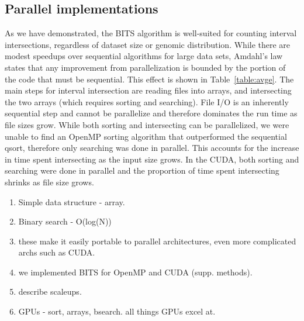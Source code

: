 \documentclass{bioinfo}
\begin{document}
	\subsection{Parallel implementations}
	
	As we have demonstrated, the BITS algorithm is well-suited for counting interval
	intersections, regardless of dataset size or genomic distribution.  While there
	are modest speedups over sequential algorithms for large data sets, Amdahl's
	law~\cite{amdahl1967} states that any improvement from parallelization is
	bounded by  the portion of the code that must be sequential.  This effect is
	shown in Table~\ref{table:avge}.  The main steps for interval intersection are
	reading files into arrays, and intersecting the two arrays (which requires
	sorting and searching).  File I/O is an inherently sequential step and cannot be
	parallelize and therefore dominates the run time as file sizes grow.  While both
	sorting and intersecting can be parallelized, we were unable to find an OpenMP
	sorting algorithm that outperformed the sequential qsort, therefore only
	searching was done in parallel.  This accounts for the increase in time spent
	intersecting as the input size grows.  In the CUDA, both sorting and searching
	were done in parallel and the proportion of time spent intersecting shrinks as
	file size grows.
	
	\begin{enumerate}
		\item Simple data structure - array.
		\item Binary search - O(log(N))
		\item these make it easily portable to parallel architectures, even 
		      more complicated archs such as CUDA.
		\item we implemented BITS for OpenMP and CUDA (supp. methods).
		\item describe scaleups.
		\item GPUs - sort, arrays, bsearch.  all things GPUs excel at.
	\end{enumerate}	
	
\end{document}
